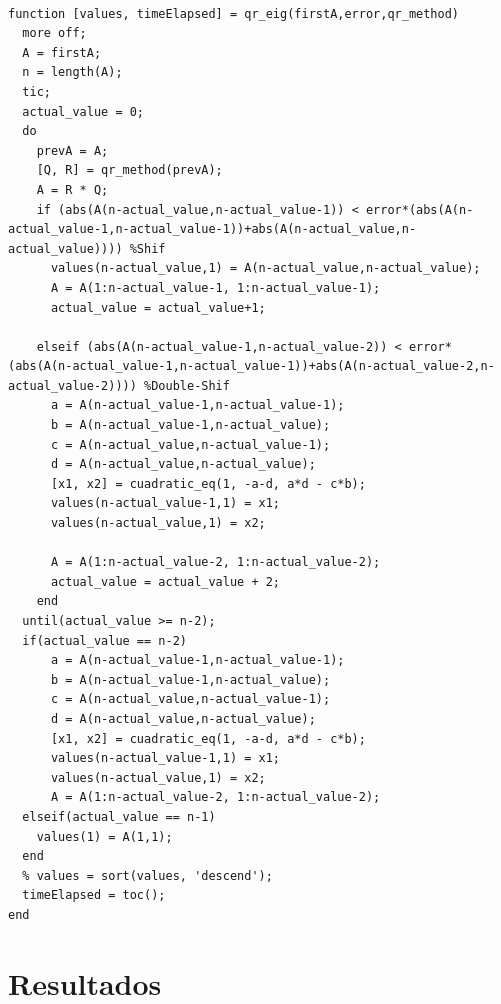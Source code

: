 \documentclass[a4paper,10pt,spanish]{article}
\begin{document}
\begin{lstlisting}[caption = Obtención de Autovalores]

function [values, timeElapsed] = qr_eig(firstA,error,qr_method)
  more off;
  A = firstA;
  n = length(A);
  tic;
  actual_value = 0;
  do
    prevA = A;
    [Q, R] = qr_method(prevA);
    A = R * Q;
    if (abs(A(n-actual_value,n-actual_value-1)) < error*(abs(A(n-actual_value-1,n-actual_value-1))+abs(A(n-actual_value,n-actual_value)))) %Shif
      values(n-actual_value,1) = A(n-actual_value,n-actual_value);
      A = A(1:n-actual_value-1, 1:n-actual_value-1);
      actual_value = actual_value+1;

    elseif (abs(A(n-actual_value-1,n-actual_value-2)) < error*(abs(A(n-actual_value-1,n-actual_value-1))+abs(A(n-actual_value-2,n-actual_value-2)))) %Double-Shif
      a = A(n-actual_value-1,n-actual_value-1);
      b = A(n-actual_value-1,n-actual_value);
      c = A(n-actual_value,n-actual_value-1);
      d = A(n-actual_value,n-actual_value);
      [x1, x2] = cuadratic_eq(1, -a-d, a*d - c*b);
      values(n-actual_value-1,1) = x1;
      values(n-actual_value,1) = x2;

      A = A(1:n-actual_value-2, 1:n-actual_value-2);
      actual_value = actual_value + 2;
    end
  until(actual_value >= n-2);
  if(actual_value == n-2)
      a = A(n-actual_value-1,n-actual_value-1);
      b = A(n-actual_value-1,n-actual_value);
      c = A(n-actual_value,n-actual_value-1);
      d = A(n-actual_value,n-actual_value);
      [x1, x2] = cuadratic_eq(1, -a-d, a*d - c*b);
      values(n-actual_value-1,1) = x1;
      values(n-actual_value,1) = x2;
      A = A(1:n-actual_value-2, 1:n-actual_value-2);
  elseif(actual_value == n-1)
    values(1) = A(1,1);
  end
  % values = sort(values, 'descend');
  timeElapsed = toc();
end

\end{lstlisting}

\pagebreak

\section{Resultados}
\end{document}
